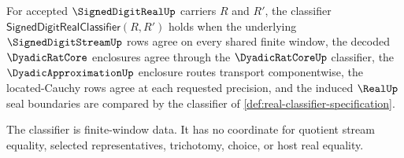 \begin{definition}
\label{def:signed-digit-real-classifier}
For accepted $\SignedDigitRealUp$ carriers $R$ and $R'$, the classifier $\mathsf{SignedDigitRealClassifier}(R,R')$ holds when the underlying $\SignedDigitStreamUp$ rows agree on every shared finite window, the decoded $\DyadicRatCore$ enclosures agree through the $\DyadicRatCoreUp$ classifier, the $\DyadicApproximationUp$ enclosure routes transport componentwise, the located-Cauchy rows agree at each requested precision, and the induced $\RealUp$ seal boundaries are compared by the classifier of \autoref{def:real-classifier-specification}.

The classifier is finite-window data. It has no coordinate for quotient stream equality, selected representatives, trichotomy, choice, or host real equality.
\end{definition}

